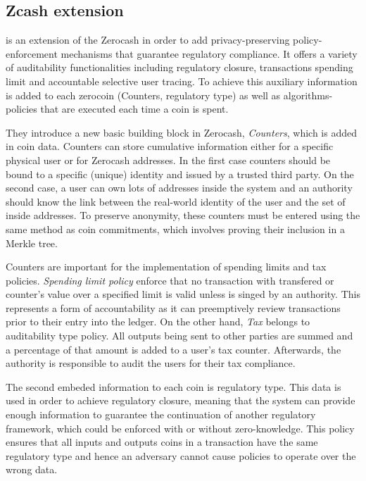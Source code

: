 \subsection{Zcash extension}

\cite{GGM16} is an extension of the Zerocash \cite{Zerocash} in order to add privacy-preserving policy-enforcement mechanisms that guarantee regulatory compliance. It offers a variety of auditability functionalities including regulatory closure, transactions spending limit and accountable selective user tracing. To achieve this auxiliary information is added to each zerocoin (Counters, regulatory type) as well as algorithms-policies that are executed each time a coin is spent. 

They introduce a new basic building block in Zerocash, \emph{Counters}, which is added in coin data. Counters can store cumulative information either for a specific physical user or for Zerocash addresses. In the first case counters should be bound to a specific (unique) identity and issued by a trusted third party. On the second case, a user can own lots of addresses inside the system and an authority should know the link between the real-world identity of the user and the set of inside addresses. To preserve anonymity, these counters must be entered using the same method as coin commitments, which involves proving their inclusion in a Merkle tree.

Counters are important for the implementation of spending limits and tax policies. \emph{Spending limit policy} enforce that no transaction with transfered or counter's value over a specified limit is valid unless is singed by an authority. This represents a form of accountability as it can preemptively review transactions prior to their entry into the ledger. On the other hand, \emph{Tax} belongs to auditability type policy. All outputs being sent to other parties are summed and a percentage of that amount is added to a  user's tax counter. Afterwards, the authority is responsible to audit the users for their tax compliance. 
 
The second embeded information to each coin is regulatory type. This data is used in order to achieve regulatory closure, meaning that the system can provide enough information to guarantee the continuation of another regulatory framework, which could be enforced with or without zero-knowledge. This policy ensures that all inputs and outputs coins in a transaction have the same regulatory type and hence an adversary cannot cause policies to operate over the wrong data.

